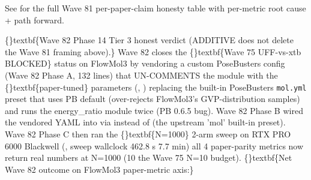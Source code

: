 \documentclass{article}
\begin{document}
See  for the full Wave 81 per-paper-claim honesty table with per-metric root cause + path forward.

\{\}textbf\{Wave 82 Phase 14 Tier 3 honest verdict (ADDITIVE  does not delete the Wave 81 framing above).\} Wave 82 closes the \{\}textbf\{Wave 75  UFF-vs-xtb BLOCKED\} status on FlowMol3 by vendoring a custom PoseBusters config  (Wave 82 Phase A, 132 lines) that UN-COMMENTS the  module with the \{\}textbf\{paper-tuned\} parameters (, )  replacing the built-in PoseBusters \texttt{mol.yml} preset that uses PB default  (over-rejects FlowMol3's GVP-distribution samples) and runs the energy\_ratio module twice (PB 0.6.5 bug). Wave 82 Phase B wired the vendored YAML into  via  instead of  (the upstream 'mol' built-in preset). Wave 82 Phase C then ran the \{\}textbf\{N=1000\} 2-arm sweep on RTX PRO 6000 Blackwell (, sweep wallclock 462.8 s  7.7 min)  all 4 paper-parity metrics now return real numbers at N=1000 (10 the Wave 75 N=10 budget). \{\}textbf\{Net Wave 82 outcome on FlowMol3 paper-metric axis:\}
\end{document}

